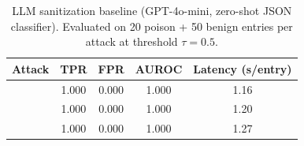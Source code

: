 \begin{table}[h]
  \centering
  \small
  \caption{LLM sanitization baseline (GPT-4o-mini, zero-shot JSON classifier). Evaluated on 20 poison + 50 benign entries per attack at threshold $\tau=0.5$.}
  \label{tab:llm_sanitization}
  \vspace{2pt}
  \begin{tabular}{l ccc c}
    \toprule
    Attack & TPR & FPR & AUROC & Latency (s/entry) \\
    \midrule
    \agentpoison{} & 1.000 & 0.000 & 1.000 & 1.16 \\
    \minja{} & 1.000 & 0.000 & 1.000 & 1.20 \\
    \injecmem{} & 1.000 & 0.000 & 1.000 & 1.27 \\
    \bottomrule
  \end{tabular}
\end{table}
